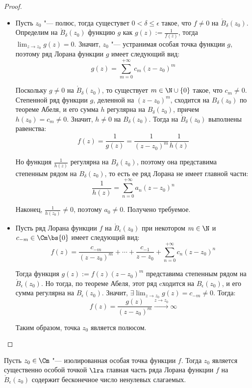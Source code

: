\begin{proof}~
	\begin{itemize}
		\item[$\ra$]Пусть $z_0$ "--- полюс, тогда сущестувет $0 < \delta \le \epsilon$ такое, что $f \ne 0$ на $\mathring B_\delta(z_0)$. Определим на $\mathring B_\delta(z_0)$ функцию $g$ как $g(z) := \frac1{f(z)}$, тогда $\lim_{z \to z_0}g(z) = 0$. Значит, $z_0$ "--- устранимая особая точка функции $g$, поэтому ряд Лорана функции $g$ имеет следующий вид:
		\[g(z) = \sum_{m = 0}^{+\infty}c_m(z - z_0)^m\]
		
		Поскольку $g \ne 0$ на $\mathring B_\delta(z_0)$, то существует $m \in \N \cup \{0\}$ такое, что $c_m \ne 0$. \pagebreak Степенной ряд функции ${g}$, деленной на ${(z - z_0)^m}$, сходится на $B_\delta(z_0)$ по теореме Абеля, и его сумма $h$ регулярна на $B_\delta(z_0)$, причем $h(z_0) = c_m \ne 0$. Значит, $h \ne 0$ на $B_\delta(z_0)$. Тогда на $\mathring B_\delta(z_0)$ выполнены равенства:
		\[f(z) = \frac{1}{g(z)} = \frac1{(z - z_0)^m}\frac1{h(z)}\]
		
		Но функция $\frac1{h(z)}$ регулярна на $B_\delta(z_0)$, поэтому она представима степенным рядом на $B_\delta(z_0)$, то есть ее ряд Лорана не имеет главной части:
		\[\frac{1}{h(z)} = \sum_{n=0}^{+\infty}a_n(z - z_0)^n\]
		
		Наконец, $\frac1{h(z_0)} \ne 0$, поэтому $a_0 \ne 0$. Получено требуемое.
		
		\item[$\la$] Пусть ряд Лорана функции $f$ на $\mathring B_\epsilon(z_0)$ при некотором $m \in \N$ и $c_{-m} \in \Cm \bs \{0\}$ имеет следующий вид:
		\[f(z) = \frac{c_{-m}}{(z-z_0)^m} + \dotsb + \frac{c_{-1}}{z-z_0} + \sum_{n = 0}^{+\infty}c_n(z - z_0)^n\]
		
		Тогда функция $g(z) := f(z)(z-z_0)^m$ представима степенным рядом на $\mathring B_\epsilon(z_0)$. Но тогда, по теореме Абеля, этот ряд cходится на $B_\epsilon(z_0)$, и его сумма регулярна на $B_\epsilon(z_0)$. Значит, $\exists\lim_{z \to z_0} g(z) = c_{-m} \ne 0$. Тогда:
		\[f(z) = \frac{g(z)}{(z - z_0)^m} \xrightarrow{z \to z_0} \infty\]
		
		Таким образом, точка $z_0$ является полюсом.\qedhere
	\end{itemize}
\end{proof}

\begin{corollary}
	Пусть $z_0 \in \Cm$ "--- изолированная особая точка функции $f$. Тогда $z_0$ является существенно особой точкой $\lra$ главная часть ряда Лорана функции $f$ на $\mathring B_\epsilon(z_0)$ содержит бесконечное число ненулевых слагаемых.
\end{corollary}

